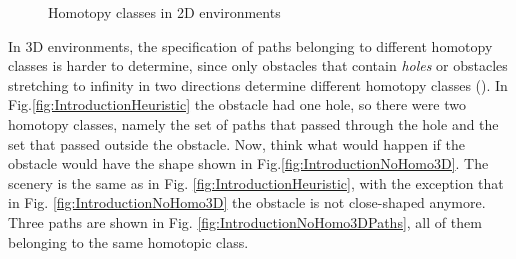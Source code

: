 \documentclass[graybox]{svmult}
\begin{document}
\begin{figure}[]
{	       \label{fig:IntroductionHomo2Dd}
          }
          \caption{Homotopy classes in 2D environments}
          \label{fig:IntroductionHomo2D}
\end{figure}

In 3D environments, the specification of paths belonging to different homotopy classes is harder to determine, since only obstacles that contain \emph{holes} or obstacles stretching to infinity in two directions determine different homotopy classes (\cite{Bhattacharya2011Homotopy3D}). In Fig.\ref{fig:IntroductionHeuristic} the obstacle had one hole, so there were two homotopy classes, namely the set of paths that passed through the hole and the set that passed outside the obstacle. Now, think what would happen if the obstacle would have the shape shown in Fig.\ref{fig:IntroductionNoHomo3D}. The scenery is the same as in Fig. \ref{fig:IntroductionHeuristic}, with the exception that in Fig. \ref{fig:IntroductionNoHomo3D} the obstacle is not close-shaped anymore. Three paths are shown in Fig. \ref{fig:IntroductionNoHomo3DPaths}, all of them belonging to the same homotopic class. 
\end{document}

